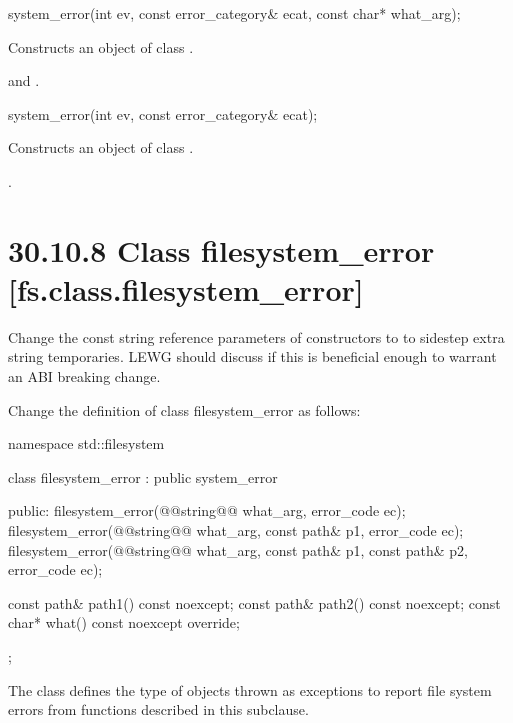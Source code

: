 \documentclass[ebook,11pt,article]{memoir}
\begin{document}
\begin{removedblock}
%
\begin{itemdecl}
system_error(int ev, const error_category& ecat, const char* what_arg);
\end{itemdecl}

\begin{itemdescr}
\pnum
\effects Constructs an object of class .

\pnum
\postconditions \raggedright {} and\linebreak
{}.
\end{itemdescr}
\end{removedblock}

%
\begin{itemdecl}
system_error(int ev, const error_category& ecat);
\end{itemdecl}

\begin{itemdescr}
\pnum
\effects Constructs an object of class .

\pnum
\postconditions {}.
\end{itemdescr}

\section{ 30.10.8 Class filesystem_error [fs.class.filesystem_error]}
Change the const string reference parameters of  constructors to  to sidestep extra string temporaries. LEWG should discuss if this is beneficial enough to warrant an ABI breaking change. 

Change the definition of class filesystem_error as follows:
%
\begin{codeblock}
namespace std::filesystem {
  class filesystem_error : public system_error {
  public:
    filesystem_error(@@string@\removed{\&}@ what_arg, error_code ec);
    filesystem_error(@@string@\removed{\&}@ what_arg,
                     const path& p1, error_code ec);
    filesystem_error(@@string@\removed{\&}@ what_arg,
                     const path& p1, const path& p2, error_code ec);

    const path& path1() const noexcept;
    const path& path2() const noexcept;
    const char* what() const noexcept override;
  };
}
\end{codeblock}
\pnum
The class  defines the type of
objects thrown as exceptions to report file system errors from functions described in this
subclause.
\end{document}
